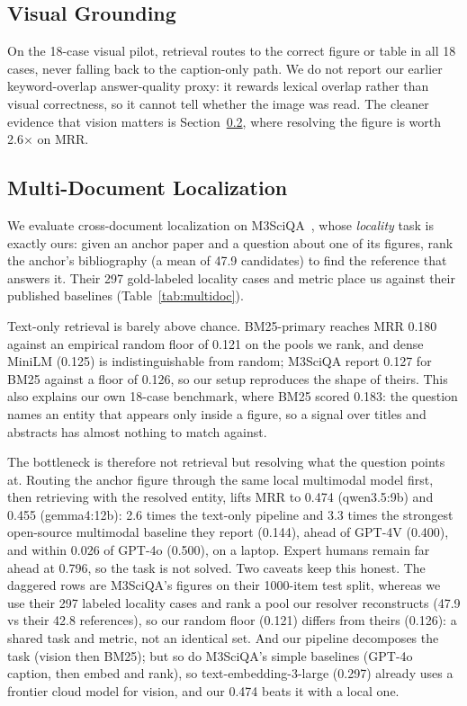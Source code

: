 \documentclass[11pt,letterpaper]{article}
\begin{document}
\subsection{Visual Grounding}
On the 18-case visual pilot, retrieval routes to the correct figure or table in all 18 cases,
never falling back to the caption-only path. We do not report our earlier keyword-overlap
answer-quality proxy: it rewards lexical overlap rather than visual correctness, so it cannot tell
whether the image was read. The cleaner evidence that vision matters is
Section~\ref{sec:auto-multidoc}, where resolving the figure is worth 2.6$\times$ on MRR.

\subsection{Multi-Document Localization}
\label{sec:auto-multidoc}
We evaluate cross-document localization on M3SciQA~\citep{li2024m3sciqa}, whose \emph{locality}
task is exactly ours: given an anchor paper and a question about one of its figures, rank the
anchor's bibliography (a mean of 47.9 candidates) to find the reference that answers it. Their
297 gold-labeled locality cases and metric place us against their published baselines
(Table~\ref{tab:multidoc}).

Text-only retrieval is barely above chance. BM25-primary reaches MRR 0.180 against an empirical
random floor of 0.121 on the pools we rank, and dense MiniLM (0.125) is indistinguishable from
random; M3SciQA report 0.127 for BM25 against a floor of 0.126, so our setup reproduces the
shape of theirs. This also explains our own 18-case benchmark, where BM25 scored 0.183: the
question names an entity that appears only inside a figure, so a signal over titles and
abstracts has almost nothing to match against.

The bottleneck is therefore not retrieval but resolving what the question points at. Routing the
anchor figure through the same local multimodal model first, then retrieving with the resolved
entity, lifts MRR to 0.474 (qwen3.5:9b) and 0.455 (gemma4:12b): 2.6 times the text-only pipeline
and 3.3 times the strongest open-source multimodal baseline they report (0.144), ahead of GPT-4V
(0.400), and within 0.026 of GPT-4o (0.500), on a laptop. Expert humans remain far ahead at
0.796, so the task is not solved. Two caveats keep this honest. The daggered rows are M3SciQA's
figures on their 1000-item test split, whereas we use their 297 labeled locality cases and rank a
pool our resolver reconstructs (47.9 vs their 42.8 references), so our random floor (0.121) differs
from theirs (0.126): a shared task and metric, not an identical set. And our pipeline decomposes the
task (vision then BM25); but so do M3SciQA's simple baselines (GPT-4o caption, then embed and rank),
so text-embedding-3-large (0.297) already uses a frontier cloud model for vision, and our 0.474
beats it with a local one.
\end{document}
